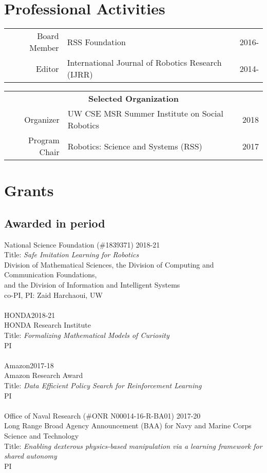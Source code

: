\documentclass[10pt]{article}
\begin{document}
\section{Professional Activities}
\begin{tabularx}{\linewidth}{rXr}
Board Member & RSS Foundation & 2016-\\
Editor & International Journal of Robotics Research (IJRR) & 2014-\\
\end{tabularx}
\begin{tabularx}{\linewidth}{rXr}
\multicolumn{3}{c}{\textbf{Selected Organization}}\\
Organizer & UW CSE MSR Summer Institute on Social Robotics & 2018\\
Program Chair & Robotics: Science and Systems (RSS) & 2017\\
\end{tabularx}


\section{Grants}

\subsection{Awarded in period}
\noindent
National Science Foundation (\#1839371) \hfill 2018-21\\
Title: \textit{Safe Imitation Learning for Robotics}\\
Division of Mathematical Sciences, the Division of Computing and Communication Foundations,\\and the Division of Information and Intelligent Systems\\
co-PI, PI: Zaid Harchaoui, UW\\
\\
HONDA\hfill 2018-21\\
HONDA Research Institute\\
Title: \textit{Formalizing Mathematical Models of Curiosity}\\
PI\\
\\
Amazon\hfill 2017-18\\
Amazon Research Award\\
Title: \textit{Data Efficient Policy Search for Reinforcement Learning}\\
PI\\
\\
Office of Naval Research (\#ONR N00014-16-R-BA01) \hfill 2017-20\\
Long Range Broad Agency Announcement (BAA) for Navy and Marine Corps Science and Technology\\
Title: \textit{Enabling dexterous physics-based manipulation via a learning framework for shared autonomy}\\
PI\\
\end{document}
